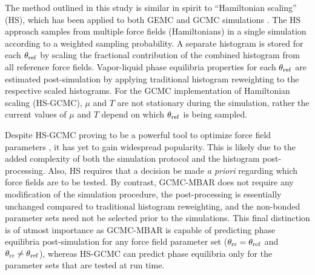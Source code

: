 \documentclass[journal=jced,manuscript=article]{achemso}
\begin{document}

The method outlined in this study is similar in spirit to ``Hamiltonian scaling'' (HS), which has been applied to both GEMC \cite{Kiyohara1996} and GCMC simulations \cite{Errington1998,Exp6,Errington1999,Pana2000}. The HS approach samples from multiple force fields (Hamiltonians) in a single simulation according to a weighted sampling probability. A separate histogram is stored for each $\theta_{\rm ref}$ by scaling the fractional contribution of the combined histogram from all reference force fields. Vapor-liquid phase equilibria properties for each $\theta_{\rm ref}$ are estimated post-simulation by applying traditional histogram reweighting to the respective scaled histograms. For the GCMC implementation of Hamiltonian scaling (HS-GCMC), $\mu$ and $T$ are not stationary during the simulation, rather the current values of $\mu$ and $T$ depend on which $\theta_{\rm ref}$ is being sampled. 


Despite HS-GCMC proving to be a powerful tool to optimize force field parameters \cite{Errington1998,Exp6,Errington1999,Pana2000}, it has yet to gain widespread popularity. This is likely due to the added complexity of both the simulation protocol and the histogram post-processing. Also, HS requires that a decision be made \textit{a priori} regarding which force fields are to be tested. By contrast, GCMC-MBAR does not require any modification of the simulation procedure, the post-processing is essentially unchanged compared to traditional histogram reweighting, and the non-bonded parameter sets need not be selected prior to the simulations. This final distinction is of utmost importance as GCMC-MBAR is capable of predicting phase equilibria post-simulation for any force field parameter set ($\theta_{\rm rr} = \theta_{\rm ref}$ and $\theta_{\rm rr} \neq \theta_{\rm ref}$), whereas HS-GCMC can predict phase equilibria only for the parameter sets that are tested at run time.
\end{document}
